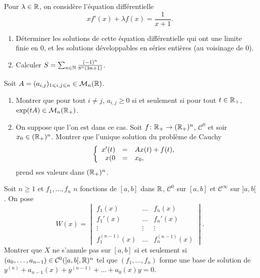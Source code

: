 \documentclass[12pt]{article}
\begin{document}
\begin{exercise}
	Pour $\lambda\in\mathbb{R}$, on considère l'équation différentielle 
	\begin{equation*}
		xf'(x)+\lambda f(x)=\frac{1}{x+1}.
	\end{equation*}
	\begin{enumerate}
		\item Déterminer les solutions de cette équation différentielle qui ont une limite finie en 0, et les solutions développables en séries entières (au voisinage de 0).
		\item Calculer $S=\sum_{n\in\mathbb{N}}\frac{(-1)^{n}}{8^{n}(3n+1)}$.
	\end{enumerate}
\end{exercise}

\begin{exercise}
	Soit $A=(a_{i,j})_{1\leqslant i,j\leqslant n}\in\mathcal{M}_n(\mathbb{R})$.
	\begin{enumerate}
		\item Montrer que pour tout $i\neq j$, $a_{i,j}\geqslant0$ si et seulement si pour tout $t\in\mathbb{R}_{+}$, $\exp(tA)\in\mathcal{M}_n(\mathbb{R}_{+})$.
		\item On suppose que l'on est dans ce cas. Soit $f\colon\mathbb{R}_{+}\to(\mathbb{R}_{+})^{n}$, $\mathcal{C}^{0}$ et soir $x_{0}\in(\mathbb{R}_{+})^{n}$. Montrer que l'unique solution du problème de Cauchy 
		\begin{equation*}
			\left\lbrace
				\begin{array}[]{rcl}
					x'(t)&=&Ax(t)+f(t),\\
					x(0&=&x_0,
				\end{array}
			\right.
		\end{equation*}
		prend ses valeurs dans $(\mathbb{R}_{+})^{n}$.
	\end{enumerate}
\end{exercise}

\begin{exercise}
	Soit $n\geqslant1$ et $f_1,\dots,f_n$ $n$ fonctions de $[a,b]$ dans $\mathbb{R}$, $\mathcal{C}^{0}$ sur $[a,b]$ et $\mathcal{C}^{\infty}$ sur $]a,b[$. On pose 
	\begin{equation*}
		W(x)=
		\begin{vmatrix}
			f_1(x) &\dots &f_n(x)\\
			f_1'(x) &\dots &f_n'(x)\\
			\vdots&\vdots&\vdots\\
			f_1^{(n-1)}(x) &\dots &f_n^{(n-1)}(x)
		\end{vmatrix}.
	\end{equation*}
	Montrer que $X$ ne s'annule pas sur $[a,b]$ si et seulement si $(a_0,\dots,a_{n-1})\in\mathcal{C}^{0}(]a,b[,\mathbb{R})^{n}$ tel que $(f_1,\dots,f_n)$ forme une base de solution de $y^{(n)}+a_{n-1}(x)+y^{(n-1)}+\dots+a_0(x)y=0$.
\end{exercise}
\end{document}
